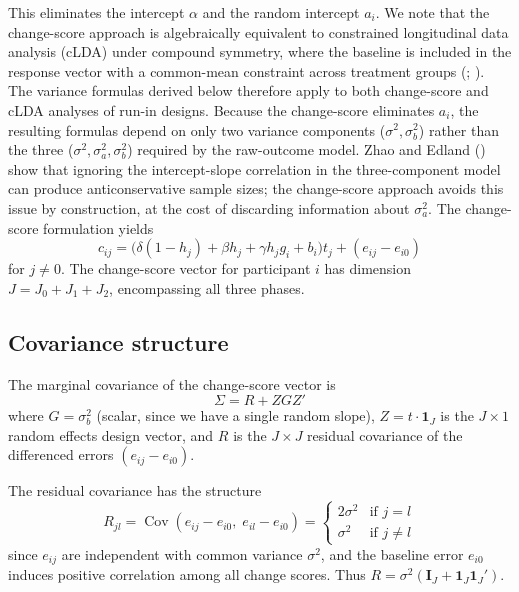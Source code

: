 \documentclass[
  11pt,
]{article}
\begin{document}
This eliminates the intercept \(\alpha\) and the random intercept
\(a_i\). We note that the change-score approach is algebraically
equivalent to constrained longitudinal data analysis (cLDA) under
compound symmetry, where the baseline is included in the response vector
with a common-mean constraint across treatment groups
(;
). The variance formulas derived below therefore apply to both
change-score and cLDA analyses of run-in designs. Because the
change-score eliminates \(a_i\), the resulting formulas depend on only
two variance components (\(\sigma^2, \sigma_b^2\)) rather than the three
(\(\sigma^2, \sigma_a^2, \sigma_b^2\)) required by the raw-outcome
model. Zhao and Edland () show that
ignoring the intercept-slope correlation in the three-component model
can produce anticonservative sample sizes; the change-score approach
avoids this issue by construction, at the cost of discarding information
about \(\sigma_a^2\). The change-score formulation yields
\begin{equation}
  c_{ij} = \bigl(\delta(1-h_j) + \beta h_j
    + \gamma h_j g_i + b_i\bigr) t_j
    + (e_{ij} - e_{i0})
  \label{eq:change_model}
\end{equation} for \(j \ne 0\). The change-score vector for participant
\(i\) has dimension \(J = J_0 + J_1 + J_2\), encompassing all three
phases.

\subsection{Covariance structure}\label{covariance-structure}

The marginal covariance of the change-score vector is \begin{equation}
  \Sigma = R + Z G Z'
  \label{eq:sigma}
\end{equation} where \(G = \sigma_b^2\) (scalar, since we have a single
random slope), \(Z = t \cdot \mathbf{1}_J\) is the \(J \times 1\) random
effects design vector, and \(R\) is the \(J \times J\) residual
covariance of the differenced errors \((e_{ij} - e_{i0})\).

The residual covariance has the structure \begin{equation}
  R_{jl} = \mathop{\mathrm{Cov}}(e_{ij} - e_{i0},\; e_{il} - e_{i0})
  = \begin{cases}
    2\sigma^2 & \text{if } j = l \\
    \sigma^2  & \text{if } j \ne l
  \end{cases}
  \label{eq:R}
\end{equation} since \(e_{ij}\) are independent with common variance
\(\sigma^2\), and the baseline error \(e_{i0}\) induces positive
correlation among all change scores. Thus
\(R = \sigma^2(\mathbf{I}_J + \mathbf{1}_J \mathbf{1}_J')\).
\end{document}
